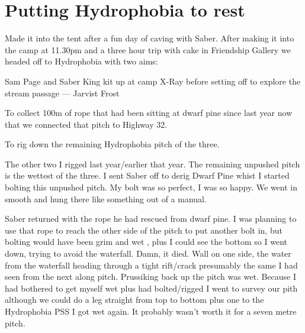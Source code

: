 \begin{marginfigure}
\end{marginfigure}

\section{Putting Hydrophobia to rest}

Made it into the tent after a fun day of caving with Saber. After making it into the camp at 11.30pm and a three hour trip with cake in Friendship Gallery we headed off to Hydrophobia  with two aims: 

\begin{marginfigure}
\centering
\vspace{100pt}
\label{sam toothbrush}
\caption{Sam Page and Saber King kit up at camp X-Ray before setting off to explore the \protect{} stream passage --- Jarvist Frost}
\end{marginfigure}


\begin{citemize} 
 \item To collect 100m of rope that had been sitting at dwarf pine since last year now that we connected that pitch to Highway 32.  
 \item To rig down the remaining Hydrophobia pitch of the three. 
 \end{citemize}
 
 The other two I rigged last year/earlier that year.  The remaining unpushed pitch is the wettest of the three. I sent Saber off to derig Dwarf Pine whist I started bolting this unpushed pitch. My bolt was so perfect, I was so happy. We went in smooth and hung there like something out of a manual. 

Saber returned with the rope he had rescued from dwarf pine.  I was planning to use that rope to reach the other side of the pitch  to put another bolt in, but bolting would have been grim and wet , plus I could see the bottom so I went down, trying to avoid the waterfall. Damn, it died. Wall on one side, the water from the waterfall heading through a tight rift/crack presumably the same I had seen from the next along pitch. Prussiking back up the pitch was wet. Because I had bothered to get myself wet plus had bolted/rigged I went to survey our pith although we could do a leg straight from top to bottom plus one to the Hydrophobia PSS I got wet again. It probably wasn't worth it for a seven metre pitch.

